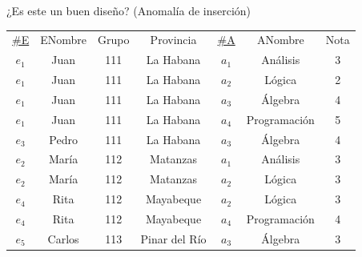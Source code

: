 \begin{frame}{¿Es este un buen dise\~no? (Anomal\'ia de inserci\'on)}
    \centering
    \begin{tabular}{ccccccc}
        \underline{\#E} & ENombre & Grupo & Provincia & \underline{\#A} & ANombre & Nota\\
        $e_1$ & Juan & {111} & { La Habana} & $a_1$ & An\'alisis & 3\\
        $e_1$ & Juan & {111} & { La Habana} & $a_2$ & L\'ogica & 2\\
        $e_1$ & Juan & {111} & { La Habana} & $a_3$ & \'Algebra & 4\\
        $e_1$ & Juan & {111} & { La Habana} & $a_4$ & Programaci\'on & 5\\
        $e_3$ & Pedro & {111} & { La Habana} & $a_3$ & \'Algebra & 4\\
        $e_2$ & Mar\'ia & {112} & { Matanzas} & $a_1$ & An\'alisis & 3\\
        $e_2$ & Mar\'ia &  {112} & { Matanzas} & $a_2$ & L\'ogica & 3\\
        $e_4$ & Rita &  {112} & { Mayabeque} & $a_2$ & L\'ogica & 3\\
        $e_4$ & Rita &  {112} & { Mayabeque} & $a_4$ & Programaci\'on & 4\\
        $e_5$ & Carlos &  {113} & { Pinar del R\'io} & $a_3$ & \'Algebra & 3
    \end{tabular}
    \vspace{5mm}

    \centering
\end{frame}

